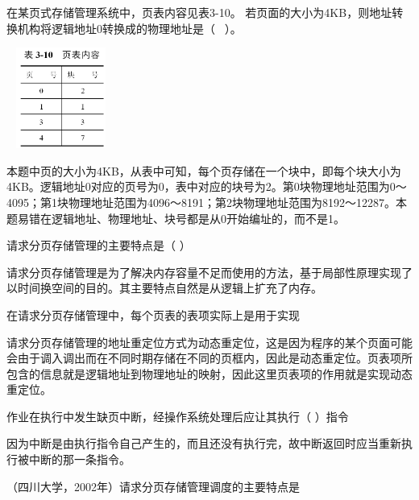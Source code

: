 \question 在某页式存储管理系统中，页表内容见表3-10。
若页面的大小为4KB，则地址转换机构将逻辑地址0转换成的物理地址是（ ~）。

~
\includegraphics[width=1.15625in,height=1.30208in]{computerassets/A5A380C2BBD77AC406A4715BAE093930.png}
\par{}
\begin{solution}本题中页的大小为4KB，从表中可知，每个页存储在一个块中，即每个块大小为4KB。逻辑地址0对应的页号为0，表中对应的块号为2。第0块物理地址范围为0～4095；第1块物理地址范围为4096～8191；第2块物理地址范围为8192～12287。本题易错在逻辑地址、物理地址、块号都是从0开始编址的，而不是1。
\end{solution}
\question 请求分页存储管理的主要特点是（ ）
\par{}
\begin{solution}请求分页存储管理是为了解决内存容量不足而使用的方法，基于局部性原理实现了以时间换空间的目的。其主要特点自然是从逻辑上扩充了内存。
\end{solution}
\question 在请求分页存储管理中，每个页表的表项实际上是用于实现
\par{}
\begin{solution}请求分页存储管理的地址重定位方式为动态重定位，这是因为程序的某个页面可能会由于调入调出而在不同时期存储在不同的页框内，因此是动态重定位。页表项所包含的信息就是逻辑地址到物理地址的映射，因此这里页表项的作用就是实现动态重定位。
\end{solution}
\question 作业在执行中发生缺页中断，经操作系统处理后应让其执行（ ）指令
\par{}
\begin{solution}因为中断是由执行指令自己产生的，而且还没有执行完，故中断返回时应当重新执行被中断的那一条指令。
\end{solution}
\question （四川大学，2002年）请求分页存储管理调度的主要特点是
\par{}
